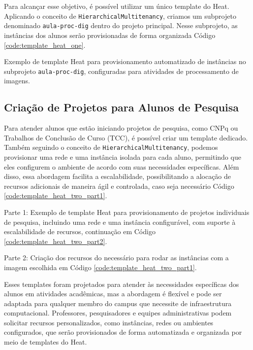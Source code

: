 Para alcançar esse objetivo, é possível utilizar um único template do Heat. Aplicando o conceito de \texttt{HierarchicalMultitenancy}, criamos um subprojeto denominado \texttt{aula-proc-dig} dentro do projeto principal. Nesse subprojeto, as instâncias dos alunos serão provisionadas de forma organizada Código \ref{code:template_heat_one}.

\begin{listing}[h!]
    \noindent{}  
  \caption{Exemplo de template Heat para provisionamento automatizado de instâncias no subprojeto \texttt{aula-proc-dig}, configuradas para atividades de processamento de imagens.}
  \label{code:template_heat_one}
\end{listing}

\newpage

\subsection{Criação de Projetos para Alunos de Pesquisa}

Para atender alunos que estão iniciando projetos de pesquisa, como CNPq ou Trabalhos de Conclusão de Curso (TCC), é possível criar um template dedicado. Também seguindo o conceito de \texttt{HierarchicalMultitenancy}, podemos provisionar uma rede e uma instância isolada para cada aluno, permitindo que eles configurem o ambiente de acordo com suas necessidades específicas. Além disso, essa abordagem facilita a escalabilidade, possibilitando a alocação de recursos adicionais de maneira ágil e controlada, caso seja necessário Código \ref{code:template_heat_two_part1}.

\begin{listing}[h!]
    \noindent{}  
  \caption{Parte 1: Exemplo de template Heat para provisionamento de projetos individuais de pesquisa, incluindo uma rede e uma instância configurável, com suporte à escalabilidade de recursos, continuação em Código \ref{code:template_heat_two_part2}.}
  \label{code:template_heat_two_part1}
\end{listing}

\begin{listing}[h!]
  \noindent{}  
\caption{Parte 2: Criação dos recursos do necessário para rodar as instâncias com a imagem escolhida em Código \ref{code:template_heat_two_part1}.}
\label{code:template_heat_two_part2}
\end{listing}

Esses templates foram projetados para atender às necessidades específicas dos alunos em atividades acadêmicas, mas a abordagem é flexível e pode ser adaptada para qualquer membro do campus que necessite de infraestrutura computacional. Professores, pesquisadores e equipes administrativas podem solicitar recursos personalizados, como instâncias, redes ou ambientes configurados, que serão provisionados de forma automatizada e organizada por meio de templates do Heat.